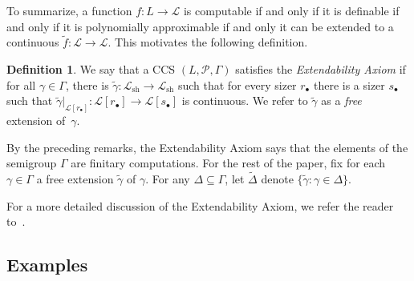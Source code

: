 \documentclass[psamsfonts]{amsart}
\theoremstyle{definition}
\newtheorem{defn}[thm]{Definition}
\theoremstyle{remark}
\numberwithin{equation}{section}
\begin{document}
To summarize, a function $f: L\to \mathcal{L}$ is computable if and only if it is definable if and only if it is polynomially approximable if and only it can be extended to a continuous $\tilde{f}: \mathcal{L} \to \mathcal{L}$.
This motivates the following definition.

\begin{defn}
\label{D:extendability axiom}
We say that a CCS $(L,\mathcal{P},\Gamma)$ satisfies the \emph{Extendability Axiom} if for all $\gamma\in \Gamma$, there is $\tilde\gamma:\mathcal{L}_{\text{sh}}\to\mathcal{L}_{\text{sh}}$ such that for every sizer $r_{\bullet}$ there is a sizer $s_\bullet$ such that $\tilde\gamma|_{\mathcal{L}[r_\bullet]}:\mathcal{L}[r_\bullet]\to\mathcal{L}[s_\bullet]$ is continuous.
We refer to $\tilde\gamma$ as a \emph{free} extension of~$\gamma$.
\end{defn}

By the preceding remarks, the Extendability Axiom says that the elements of the semigroup $\Gamma$ are finitary computations.
For the rest of the paper, fix for each $\gamma\in\Gamma$ a free extension $\tilde{\gamma}$ of $\gamma$.
For any  $\Delta\subseteq\Gamma$, let $\tilde{\Delta}$ denote $\{\tilde\gamma\colon\gamma\in\Delta\}$.

For a more detailed discussion of the Extendability Axiom, we refer the reader to~\cite{alva2024approximability}.

\subsection{Examples}
\end{document}
